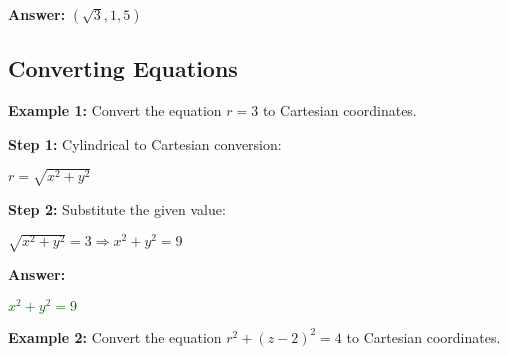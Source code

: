 \documentclass[10pt]{article}                               %
\begin{document}
\begin{adjustwidth}{2em}{0pt}
\begin{adjustwidth}{2em}{0pt}
\begin{examplebox}
\begin{adjustwidth}{2em}{0pt}
                \textbf{Answer:} \( \left(\sqrt{3}, 1, 5\right) \)

            \end{adjustwidth}

        \end{examplebox}

        \begin{examplebox}
        
            \subsection*{Converting Equations}
        
            \textbf{Example 1:} Convert the equation \( r = 3 \) to Cartesian coordinates.
            \vspace{0.5em}
        
            \begin{adjustwidth}{2em}{0pt}
        
                \textbf{Step 1:} Cylindrical to Cartesian conversion:
        
                \vspace{0.25em}
        
                \( r = \sqrt{x^2 + y^2} \)
        
                \vspace{0.5em}
        
                \textbf{Step 2:} Substitute the given value:
        
                \vspace{0.25em}
        
                \( \sqrt{x^2 + y^2} = 3 \Rightarrow x^2 + y^2 = 9 \)
        
                \vspace{0.5em}
        
                \textbf{Answer:}
        
                \vspace{0.25em}
        
                \textcolor{darkgreen}{\( x^2 + y^2 = 9 \)}
        
            \end{adjustwidth}

            \textbf{Example 2:} Convert the equation \( r^2 + (z - 2)^2 = 4 \) to Cartesian coordinates.
            \vspace{0.5em}
        
            \begin{adjustwidth}{2em}{0pt}
        

\end{adjustwidth}
\end{examplebox}
\end{adjustwidth}
\end{adjustwidth}
\end{document}
